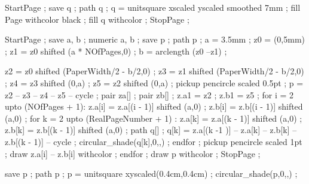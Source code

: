 StartPage ;
save q ; path q ;
q = unitsquare xscaled \overlaywidth yscaled \overlayheight smoothed 7mm ;
fill Page withcolor black ;
fill q withcolor  ;
StopPage ;
\stopuniqueMPgraphic

StartPage ;
save a, b ; numeric a, b ;
save p ; path p ;
a = 3.5mm ;
z0 = (0,5mm) ;
z1 = z0 shifted (a * NOfPages,0) ;
b = arclength (z0 --z1) ;

z2 = z0 shifted (PaperWidth/2 - b/2,0) ;
z3 = z1 shifted (PaperWidth/2 - b/2,0) ;
z4 = z3 shifted (0,a) ;
z5 = z2 shifted (0,a) ;
pickup pencircle scaled 0.5pt ;
p = z2 -- z3 -- z4 -- z5 -- cycle ;
pair za[] ;
pair zb[] ;
z.a1 = z2 ;
z.b1 = z5 ;
for i = 2 upto (NOfPages + 1):
  z.a[i] = z.a[(i - 1)] shifted (a,0) ;
  z.b[i] = z.b[(i - 1)] shifted (a,0) ;
  for k = 2 upto (RealPageNumber + 1) :
    z.a[k] = z.a[(k - 1)] shifted (a,0) ;
    z.b[k] = z.b[(k - 1)] shifted (a,0) ;
    path q[] ;
    q[k] = z.a[(k -1 )] -- z.a[k] -- z.b[k] -- z.b[(k - 1)] -- cycle ;
    circular_shade(q[k],0,,) ;
  endfor ;
  pickup pencircle scaled 1pt ;
  draw z.a[i] -- z.b[i] withcolor  ;
endfor ;
draw p withcolor  ;
StopPage ;
\stopuseMPgraphic

save p ; path p ;
p = unitsquare xyscaled(0.4cm,0.4cm) ;
circular_shade(p,0,,) ;
\stopuniqueMPgraphic








